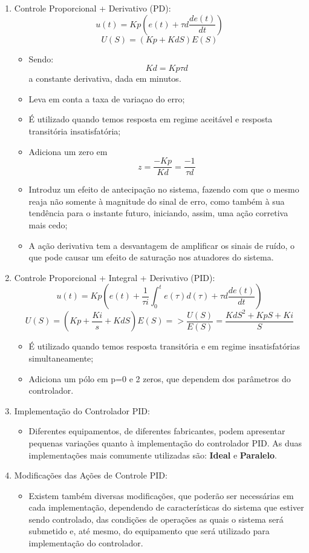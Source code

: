 \begin{enumerate}
    \item Controle Proporcional + Derivativo (PD):
        \[u(t)=Kp(e(t)+\tau d\frac{de(t)}{dt})\]
        \[U(S)=(Kp+KdS)E(S)\]
        \begin{itemize}
            \item Sendo: \[Kd=Kp\tau d\] a constante derivativa, dada em minutos.
            \item Leva em conta a taxa de variaçao do erro;
            \item É utilizado quando temos resposta em regime aceitável e resposta transitória insatisfatória;
            \item Adiciona um zero em \[z=\frac{-Kp}{Kd}=\frac{-1}{\tau d}\]
            \item Introduz um efeito de antecipação no sistema, fazendo com que o mesmo reaja não somente à magnitude do sinal de erro, como também à sua tendência para o instante futuro, iniciando, assim, uma ação corretiva mais cedo;
            \item A ação derivativa tem a desvantagem de amplificar os sinais de ruído, o que pode causar um efeito de saturação nos atuadores do sistema.
        \end{itemize}
        
    \item Controle Proporcional + Integral + Derivativo (PID):
        \[u(t)=Kp(e(t)+\frac{1}{\tau i}\int_{0}^{t}e(\tau)d(\tau)+\tau d\frac{de(t)}{dt})\]
        \[U(S)=(Kp+\frac{Ki}{s}+KdS)E(S) => \frac{U(S)}{E(S)}=\frac{KdS^2+KpS+Ki}{S}\]
        \begin{itemize}
                    \item É utilizado quando temos resposta transitória e em regime insatisfatórias simultaneamente;
            \item Adiciona um pólo em p=0 e 2 zeros, que dependem dos parâmetros do controlador.
        \end{itemize}
        
    \item Implementação do Controlador PID:
        \begin{itemize}
            \item Diferentes equipamentos, de diferentes fabricantes, podem apresentar pequenas variações quanto à implementação do controlador PID. As duas implementações mais comumente utilizadas são: \textbf{Ideal} e \textbf{Paralelo}.
        \end{itemize}
        
    \item Modificações das Ações de Controle PID:
        \begin{itemize}
            \item Existem também diversas modificações, que poderão ser necessárias em cada implementação, dependendo de características do sistema que estiver sendo controlado, das condições de operações as quais o sistema será submetido e, até mesmo, do equipamento que será utilizado para implementação do controlador.
            \newline
        \end{itemize}
        

\end{enumerate}
